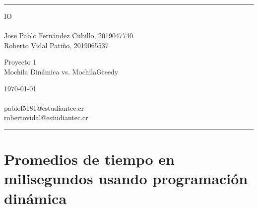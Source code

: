 \documentclass[a4paper]{article}
\begin{document}

\fancyhead[C]{}
\hrule \medskip %
\begin{minipage}{0.295\textwidth} %
\raggedright
IO\\ %
\footnotesize %
\hfill\\
Jose Pablo Fernández Cubillo, 2019047740 \\%
Roberto Vidal Patiño, 2019065537%
\end{minipage}
\begin{minipage}{0.4\textwidth} %
\centering 
\large %
Proyecto 1\\ %
\normalsize %
Mochila Dinámica vs. MochilaGreedy\\ %
\end{minipage}
\begin{minipage}{0.295\textwidth} %
\raggedleft
\today\\ %
\footnotesize %
\hfill\\
pablof5181@estudiantec.cr\\
robertovidal@estudiantec.cr%
\end{minipage}
\medskip\hrule %
\bigskip

\section{Promedios de tiempo en milisegundos usando programación dinámica}
\end{document}
